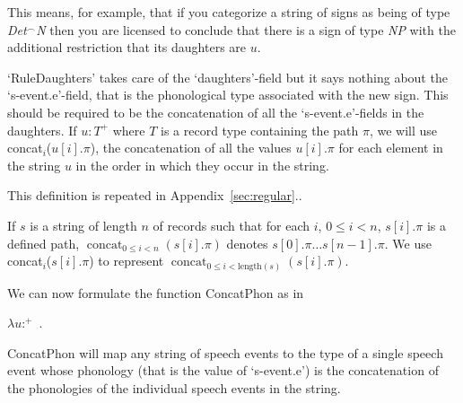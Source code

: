 
\begin{ex}
  \begin{prooftree}
  \end{prooftree}
  
\end{ex} 
This means, for example, that if you categorize a string of signs as
being of type \textit{Det}$^{\frown}$\textit{N} then you are licensed to conclude
that there is a sign of type \textit{NP} with the additional
restriction that its daughters are $u$.   

`RuleDaughters' takes care of the `daughters'-field but it says
nothing about the `s-event.e'-field, that is the phonological type
associated with the new sign.  This should be required to be the
concatenation of all the `s-event.e'-fields in the daughters. If
$u:T^+$ where $T$ is a record type containing the path $\pi$, we will
use concat$_i$($u[i].\pi$),
the concatenation of all the values $u[i].\pi$ for each element in the
string $u$ in the order in which they occur in the string.

\begin{shaded}
This
definition is repeated in
Appendix~\ref{sec:regular}.\label{pg:concat-i}.

If $s$ is a string of length $n$ of records such that for each $i$,
$0\leq i<n$, $s[i].\pi$ is a defined path, 
$\displaystyle\mathop{\mathrm{concat}}_{0\leq i<n}(s[i].\pi)$ denotes
$s[0].\pi\ldots s[n-1].\pi$.  We use
concat$_i$($s[i].\pi$) to represent
$\displaystyle\mathop{\mathrm{concat}}_{0\leq
  i<\mathrm{length}(s)}(s[i].\pi)$.
\end{shaded}

We can now
formulate the function ConcatPhon as in \nexteg{}
\begin{ex} 
$\lambda
u$:$^+$\
. \\
\hspace*{1em} 
\end{ex} 
ConcatPhon will map any string of speech events to the type of a
single speech event whose phonology (that is the value of `s-event.e')
is the concatenation of the phonologies of the individual speech
events in the string.


